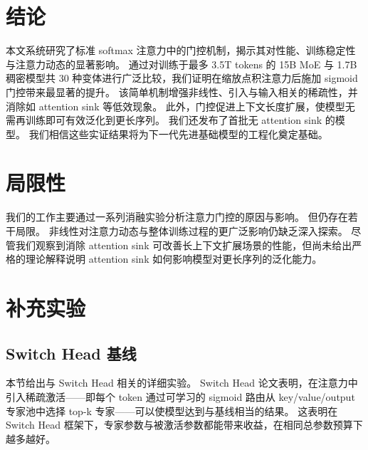 \documentclass{article} %
\begin{document}
\section{结论}

本文系统研究了标准 softmax 注意力中的门控机制，揭示其对性能、训练稳定性与注意力动态的显著影响。
通过对训练于最多 3.5T tokens 的 15B MoE 与 1.7B 稠密模型共 30 种变体进行广泛比较，我们证明在缩放点积注意力后施加 sigmoid 门控带来最显著的提升。
该简单机制增强非线性、引入与输入相关的稀疏性，并消除如 attention sink 等低效现象。
此外，门控促进上下文长度扩展，使模型无需再训练即可有效泛化到更长序列。
我们还发布了首批无 attention sink 的模型。
我们相信这些实证结果将为下一代先进基础模型的工程化奠定基础。




\section*{局限性}

我们的工作主要通过一系列消融实验分析注意力门控的原因与影响。
但仍存在若干局限。
非线性对注意力动态与整体训练过程的更广泛影响仍缺乏深入探索。
尽管我们观察到消除 attention sink 可改善长上下文扩展场景的性能，但尚未给出严格的理论解释说明 attention sink 如何影响模型对更长序列的泛化能力。




\appendix

\section{补充实验}



\subsection{Switch Head 基线}
\label{sec:switch}

本节给出与 Switch Head 相关的详细实验。
Switch Head 论文表明，在注意力中引入稀疏激活——即每个 token 通过可学习的 sigmoid 路由从 key/value/output 专家池中选择 top-k 专家——可以使模型达到与基线相当的结果。
这表明在 Switch Head 框架下，专家参数与被激活参数都能带来收益，在相同总参数预算下越多越好。
\end{document}
